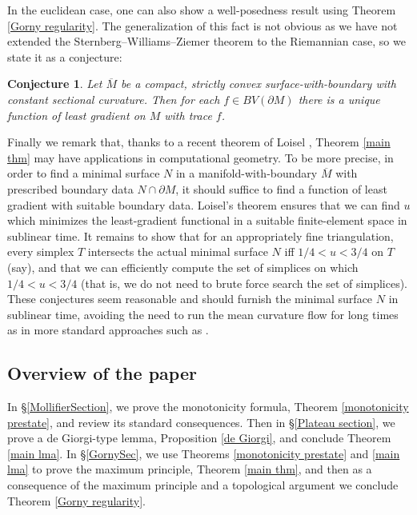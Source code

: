 \documentclass[reqno,10pt]{amsart}
\newtheorem{conjecture}[theorem]{Conjecture}
\theoremstyle{definition}
\numberwithin{equation}{section}
\begin{document}
In the euclidean case, one can also show a well-posedness result \cite[Theorem 1.1]{górny2017planar} using Theorem \ref{Gorny regularity}.
The generalization of this fact is not obvious as we have not extended the Sternberg--Williams--Ziemer theorem \cite{ZiemerWilliamsSternberg1992} to the Riemannian case, so we state it as a conjecture:

\begin{conjecture}\label{Sternberg}
Let $\overline M$ be a compact, strictly convex surface-with-boundary with constant sectional curvature.
Then for each $f \in BV(\partial M)$ there is a unique function of least gradient on $M$ with trace $f$.
\end{conjecture}

Finally we remark that, thanks to a recent theorem of Loisel \cite{Loisel20}, Theorem \ref{main thm} may have applications in computational geometry.
To be more precise, in order to find a minimal surface $N$ in a manifold-with-boundary $\overline M$ with prescribed boundary data $N \cap \partial M$, it should suffice to find a function of least gradient with suitable boundary data.
Loisel's theorem ensures that we can find $u$ which minimizes the least-gradient functional in a suitable finite-element space in sublinear time.
It remains to show that for an appropriately fine triangulation, every simplex $T$ intersects the actual minimal surface $N$ iff $1/4 < u < 3/4$ on $T$ (say), and that we can efficiently compute the set of simplices on which $1/4 < u < 3/4$ (that is, we do not need to brute force search the set of simplices).
These conjectures seem reasonable and should furnish the minimal surface $N$ in sublinear time, avoiding the need to run the mean curvature flow for long times as in more standard approaches such as \cite{Thomas05}.

\subsection{Overview of the paper}
In \S\ref{MollifierSection}, we prove the monotonicity formula, Theorem \ref{monotonicity prestate}, and review its standard consequences.
Then in \S\ref{Plateau section}, we prove a de Giorgi-type lemma, Proposition \ref{de Giorgi}, and conclude Theorem \ref{main lma}.
In \S\ref{GornySec}, we use Theorems \ref{monotonicity prestate} and \ref{main lma} to prove the maximum principle, Theorem \ref{main thm}, and then as a consequence of the maximum principle and a topological argument we conclude Theorem \ref{Gorny regularity}.
\end{document}
